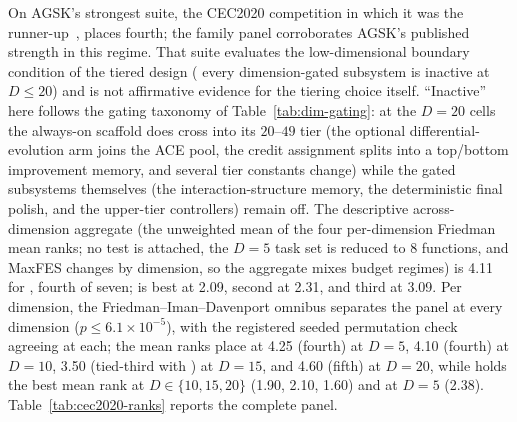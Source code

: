 On AGSK's strongest suite, the CEC2020 competition in which it was
the runner-up~\cite{mohamed2020agsk}, \dtgsk{} places fourth; the family
panel corroborates AGSK's published strength in this regime.  That suite
evaluates the low-dimensional boundary condition of the tiered design (%
every dimension-gated \dtgsk{} subsystem is inactive at $D \leq 20$)
and is not affirmative evidence for the tiering choice itself.
``Inactive'' here follows the gating taxonomy of
Table~\ref{tab:dim-gating}: at the $D = 20$ cells the always-on scaffold
does cross into its $20$--$49$ tier (the optional
differential-evolution arm joins the ACE pool, the credit assignment
splits into a top/bottom improvement memory, and several tier constants
change) while the gated subsystems themselves (the
interaction-structure memory, the deterministic final polish, and the
upper-tier controllers) remain off.
The descriptive across-dimension aggregate (the unweighted mean of the
four per-dimension Friedman mean ranks; no test is attached, the $D = 5$
task set is reduced to 8 functions, and MaxFES changes by dimension, so
the aggregate mixes budget regimes) is 4.11 for \dtgsk{}, fourth of
seven; \agsk{} is best at 2.09, \fdbagsk{} second at 2.31, and \apgsk{}
third at 3.09.
Per dimension, the Friedman--Iman--Davenport omnibus separates the panel
at every dimension ($p \leq 6.1 \times 10^{-5}$), with the registered
seeded permutation check agreeing at each; the mean ranks place \dtgsk{}
at 4.25 (fourth) at $D = 5$, 4.10 (fourth) at $D = 10$, 3.50 (tied-third
with \apgsk{}) at $D = 15$, and 4.60 (fifth) at $D = 20$, while \agsk{}
holds the best mean rank at $D \in \{10, 15, 20\}$ (1.90, 2.10, 1.60)
and \apgsk{} at $D = 5$ (2.38).
Table~\ref{tab:cec2020-ranks} reports the complete panel.

